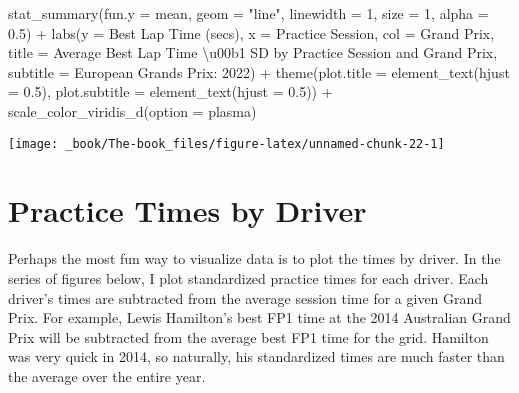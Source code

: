 \documentclass[
]{book}
\newenvironment{Shaded}{\begin{snugshade}}{\end{snugshade}}
\newcommand{\AttributeTok}[1]{\textcolor[rgb]{0.77,0.63,0.00}{#1}}
\newcommand{\DecValTok}[1]{\textcolor[rgb]{0.00,0.00,0.81}{#1}}
\newcommand{\FloatTok}[1]{\textcolor[rgb]{0.00,0.00,0.81}{#1}}
\newcommand{\FunctionTok}[1]{\textcolor[rgb]{0.00,0.00,0.00}{#1}}
\newcommand{\NormalTok}[1]{#1}
\newcommand{\SpecialCharTok}[1]{\textcolor[rgb]{0.00,0.00,0.00}{#1}}
\newcommand{\StringTok}[1]{\textcolor[rgb]{0.31,0.60,0.02}{#1}}
\begin{document}
\begin{Shaded}
\begin{Highlighting}[]
  \FunctionTok{stat\_summary}\NormalTok{(}\AttributeTok{fun.y =}\NormalTok{ mean,}
               \AttributeTok{geom =} \StringTok{"line"}\NormalTok{, }
               \AttributeTok{linewidth =} \DecValTok{1}\NormalTok{, }\AttributeTok{size =} \DecValTok{1}\NormalTok{, }\AttributeTok{alpha =} \FloatTok{0.5}\NormalTok{) }\SpecialCharTok{+}
  \FunctionTok{labs}\NormalTok{(}\AttributeTok{y =} \StringTok{\textquotesingle{}Best Lap Time (secs)\textquotesingle{}}\NormalTok{,}
       \AttributeTok{x =} \StringTok{\textquotesingle{}Practice Session\textquotesingle{}}\NormalTok{,}
       \AttributeTok{col =} \StringTok{\textquotesingle{}Grand Prix\textquotesingle{}}\NormalTok{,}
       \AttributeTok{title =} \StringTok{\textquotesingle{}Average Best Lap Time \textbackslash{}u00b1 SD by Practice Session and Grand Prix\textquotesingle{}}\NormalTok{,}
       \AttributeTok{subtitle =} \StringTok{\textquotesingle{}European Grands Prix: 2022\textquotesingle{}}\NormalTok{) }\SpecialCharTok{+}
  \FunctionTok{theme}\NormalTok{(}\AttributeTok{plot.title =} \FunctionTok{element\_text}\NormalTok{(}\AttributeTok{hjust =} \FloatTok{0.5}\NormalTok{),}
        \AttributeTok{plot.subtitle =} \FunctionTok{element\_text}\NormalTok{(}\AttributeTok{hjust =} \FloatTok{0.5}\NormalTok{)) }\SpecialCharTok{+}
  \FunctionTok{scale\_color\_viridis\_d}\NormalTok{(}\AttributeTok{option =} \StringTok{\textquotesingle{}plasma\textquotesingle{}}\NormalTok{)}
\end{Highlighting}
\end{Shaded}

\begin{center}\texttt{[image: \_book/The-book\_files/figure-latex/unnamed-chunk-22-1]} \end{center}

\hypertarget{practice-times-by-driver}{%
\section{Practice Times by Driver}\label{practice-times-by-driver}}

Perhaps the most fun way to visualize data is to plot the times by driver. In the series of figures below, I plot standardized practice times for each driver. Each driver's times are subtracted from the average session time for a given Grand Prix. For example, Lewis Hamilton's best FP1 time at the 2014 Australian Grand Prix will be subtracted from the average best FP1 time for the grid. Hamilton was very quick in 2014, so naturally, his standardized times are much faster than the average over the entire year.
\end{document}
